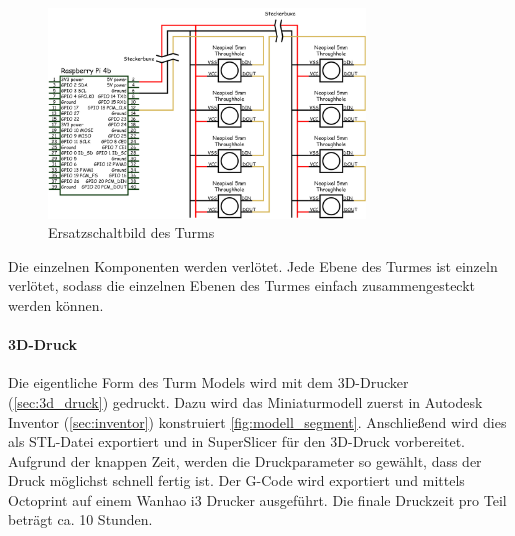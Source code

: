 \begin{figure}[H]
  \centering
  \includegraphics[width=0.75\textwidth]{images/tower_controller_v4_circuit_diagram.png}
  \caption{Ersatzschaltbild des Turms}
  \label{fig:ersatzschaltbild}
\end{figure}

Die einzelnen Komponenten werden verlötet. Jede Ebene des Turmes ist einzeln verlötet, sodass die einzelnen Ebenen des Turmes einfach zusammengesteckt werden können.

\paragraph{3D-Druck}

Die eigentliche Form des Turm Models wird mit dem 3D-Drucker (\ref{sec:3d_druck}) gedruckt. Dazu wird das Miniaturmodell zuerst in Autodesk Inventor (\ref{sec:inventor}) konstruiert \ref{fig:modell_segment}. Anschließend wird dies als STL-Datei exportiert und in SuperSlicer für den 3D-Druck vorbereitet. Aufgrund der knappen Zeit, werden die Druckparameter so gewählt, dass der Druck möglichst schnell fertig ist. Der G-Code wird exportiert und mittels Octoprint auf einem Wanhao i3 Drucker ausgeführt. Die finale Druckzeit pro Teil beträgt ca. 10 Stunden.